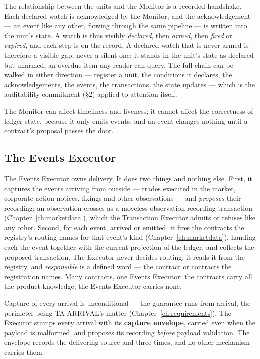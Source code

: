 \documentclass[11pt,a4paper]{article}
\begin{document}
The relationship between the units and the Monitor is a recorded handshake.
Each declared watch is acknowledged by the Monitor, and the acknowledgement ---
an event like any other, flowing through the same pipeline --- is written into
the unit's state. A watch is thus visibly \emph{declared}, then \emph{armed},
then \emph{fired} or \emph{expired}, and each step is on the record. A declared
watch that is never armed is therefore a visible gap, never a silent one: it
stands in the unit's state as declared-but-unarmed, an overdue item any reader
can query. The full chain can be walked in either direction --- register a
unit, the conditions it declares, the acknowledgements, the events, the
transactions, the state updates --- which is the auditability commitment
(\S2) applied to attention itself.

The Monitor can affect timeliness and liveness; it cannot affect the
correctness of ledger state, because it only emits events, and an event changes
nothing until a contract's proposal passes the door.

\subsection{The Events Executor}

The Events Executor owns delivery. It does two things and nothing else. First,
it captures the events arriving from outside --- trades executed in the market,
corporate-action notices, fixings and other observations --- and \emph{proposes}
their recording: an observation crosses as a moveless observation-recording
transaction (Chapter~\ref{ch:marketdata}), which the Transaction Executor admits
or refuses like any other. Second, for each event, arrived or emitted, it fires the contracts the registry's
routing names for that event's kind (Chapter~\ref{ch:marketdata}), handing each the event
together with the current projection of the ledger, and collects the proposed transaction.
The Executor never decides routing; it reads it from the registry, and \emph{responsible}
is a defined word --- the contract or contracts the registration names. Many
contracts, one Events Executor: the contracts carry all the product knowledge;
the Events Executor carries none.

Capture of every arrival is unconditional --- the guarantee runs from arrival, the
perimeter being TA-ARRIVAL's matter (Chapter~\ref{ch:requirements}). The Executor stamps
every arrival with its \textbf{capture envelope}, carried even when the payload is malformed,
and proposes its recording \emph{before} payload validation. The envelope records the
delivering source and three times, and no other mechanism carries them.
\end{document}
